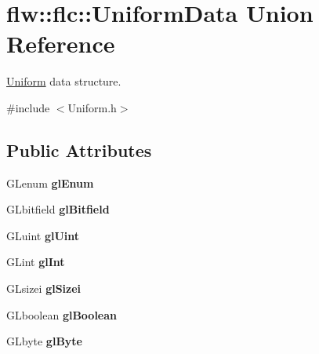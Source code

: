 \hypertarget{unionflw_1_1flc_1_1UniformData}{}\section{flw\+:\+:flc\+:\+:Uniform\+Data Union Reference}
\label{unionflw_1_1flc_1_1UniformData}


\hyperlink{classflw_1_1flc_1_1Uniform}{Uniform} data structure.  




{\ttfamily \#include $<$Uniform.\+h$>$}

\subsection*{Public Attributes}
\begin{DoxyCompactItemize}
\item 
G\+Lenum {\bfseries gl\+Enum}\hypertarget{unionflw_1_1flc_1_1UniformData_a9b9b3f9b548115607ea61cbd069d4eef}{}\label{unionflw_1_1flc_1_1UniformData_a9b9b3f9b548115607ea61cbd069d4eef}

\item 
G\+Lbitfield {\bfseries gl\+Bitfield}\hypertarget{unionflw_1_1flc_1_1UniformData_a9da20ca9bd210cfc52a97cd87c6e505a}{}\label{unionflw_1_1flc_1_1UniformData_a9da20ca9bd210cfc52a97cd87c6e505a}

\item 
G\+Luint {\bfseries gl\+Uint}\hypertarget{unionflw_1_1flc_1_1UniformData_a6ce2e035176e55b7f4ad77e6ff12ed06}{}\label{unionflw_1_1flc_1_1UniformData_a6ce2e035176e55b7f4ad77e6ff12ed06}

\item 
G\+Lint {\bfseries gl\+Int}\hypertarget{unionflw_1_1flc_1_1UniformData_a5d98d9d627f7d15bb0faa52cf73062d4}{}\label{unionflw_1_1flc_1_1UniformData_a5d98d9d627f7d15bb0faa52cf73062d4}

\item 
G\+Lsizei {\bfseries gl\+Sizei}\hypertarget{unionflw_1_1flc_1_1UniformData_aac906b35676f443b689062b96b445ee9}{}\label{unionflw_1_1flc_1_1UniformData_aac906b35676f443b689062b96b445ee9}

\item 
G\+Lboolean {\bfseries gl\+Boolean}\hypertarget{unionflw_1_1flc_1_1UniformData_a33ab81a756eebca6dd9840d4b785558a}{}\label{unionflw_1_1flc_1_1UniformData_a33ab81a756eebca6dd9840d4b785558a}

\item 
G\+Lbyte {\bfseries gl\+Byte}\hypertarget{unionflw_1_1flc_1_1UniformData_a45a866dec202075c49e411415b47b8a7}{}\label{unionflw_1_1flc_1_1UniformData_a45a866dec202075c49e411415b47b8a7}


\end{DoxyCompactItemize}

